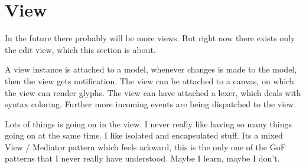 \documentclass[a4paper,12pt]{article}
\begin{document}
\newpage
\section{View}
In the future there probably will be more views. But right now
there exists only the edit view, which this section is about.

A view instance is attached to a model, whenever changes is made
to the model, then the view gets notification. The view can be 
attached to a canvas, on which the view can render glyphs.
The view can have attached a lexer, which deals with syntax coloring. 
Further more incoming events are being dispatched to the view. 

Lots of things is going on in the view. I never really like
having so many things going on at the same time. I like isolated and
encapsulated stuff. Its a mixed View / Mediator pattern which feels 
ackward, this is the only one of the GoF patterns that I never really 
have understood. Maybe I learn, maybe I don't.
\end{document}
